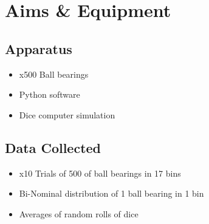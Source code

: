 \documentclass[11pt]{article}
\begin{document}

\section{Aims \& Equipment}
\label{AimsEquipmentSection}


\subsection{Apparatus}
\label{Apparatus SubSection}

\begin{multicols}{2}
\begin{itemize}
    \item{x500 Ball bearings }
    \item{Python software}
    \item{Dice computer simulation}
\end{itemize}
\end{multicols}


\subsection{Data Collected}
\label{Data Collected SubSection}

\begin{multicols}{2}
\begin{itemize}
    \item{x10 Trials of 500 of ball bearings in 17 bins}
    \item{Bi-Nominal distribution of 1 ball bearing in 1 bin}
    \item{Averages of random rolls of dice}
\end{itemize}
\end{multicols}

\end{document}
